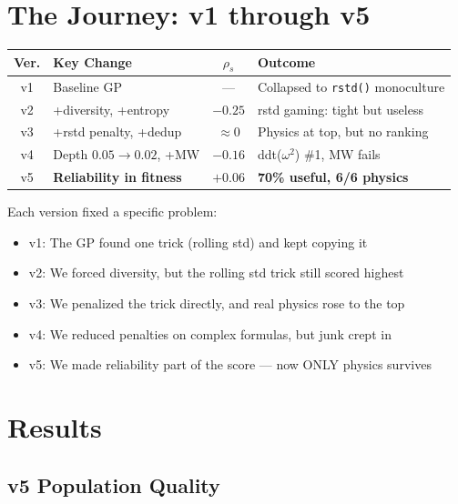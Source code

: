 \documentclass[11pt,a4paper]{article}
\begin{document}
\section{The Journey: v1 through v5}

\begin{center}
\begin{tabular}{clcp{6cm}}
\toprule
\textbf{Ver.} & \textbf{Key Change} & $\rho_s$ & \textbf{Outcome} \\
\midrule
v1 & Baseline GP & --- & Collapsed to \texttt{rstd()} monoculture \\
v2 & +diversity, +entropy & $-0.25$ & rstd gaming: tight but useless \\
v3 & +rstd penalty, +dedup & $\approx 0$ & Physics at top, but no ranking \\
v4 & Depth $0.05\to0.02$, +MW & $-0.16$ & ddt($\omega^2$) \#1, MW fails \\
v5 & \textbf{Reliability in fitness} & $+0.06$ & \textbf{70\% useful, 6/6 physics} \\
\bottomrule
\end{tabular}
\end{center}

\begin{plainbox}
Each version fixed a specific problem:
\begin{itemize}
    \item v1: The GP found one trick (rolling std) and kept copying it
    \item v2: We forced diversity, but the rolling std trick still scored highest
    \item v3: We penalized the trick directly, and real physics rose to the top
    \item v4: We reduced penalties on complex formulas, but junk crept in
    \item v5: We made reliability part of the score --- now ONLY physics survives
\end{itemize}
\end{plainbox}

\section{Results}

\subsection{v5 Population Quality}
\end{document}
